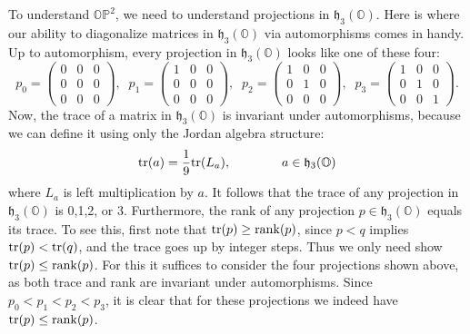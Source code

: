 \documentclass[12pt]{article}
\renewcommand\O{{\mathbb O}}
\newcommand\OP{{\mathbb {OP}}}
\newcommand{\h}{{\mathfrak {h}}}
\newcommand{\tr}{{\rm tr}}
\newcommand{\rank}{{\rm rank}}
\begin{document}
To understand $\OP^2$, we need to understand projections in $\h_3(\O)$.  
Here is where our ability to diagonalize matrices in $\h_3(\O)$ via 
automorphisms comes in handy.  Up to automorphism, every projection in 
$\h_3(\O)$ looks like one of these four: 
\[  
p_0 = 
\left( \begin{array}{ccc}  
                         0  &  0  & 0         \\  
                         0  &  0  & 0           \\ 
                         0  &  0  & 0   \end{array} \right) , \; \;
p_1 =  
\left( \begin{array}{ccc}  
                         1  &  0  & 0         \\  
                         0  &  0  & 0           \\ 
                         0  &  0  & 0   \end{array} \right) , \; \;
p_2 =  
\left( \begin{array}{ccc}  
                         1  &  0  & 0         \\  
                         0  &  1  & 0           \\ 
                         0  &  0  & 0   \end{array} \right) , \; \;
p_3 =  
\left( \begin{array}{ccc}  
                         1  &  0  & 0         \\  
                         0  &  1  & 0           \\ 
                         0  &  0  & 1   \end{array} \right) .  \] 
Now, the trace of a matrix in $\h_3(\O)$ is invariant under 
automorphisms, because we can define it using only the Jordan algebra 
structure: 
\[        \tr(a) = {1\over 9} \tr(L_a)    , \qquad \qquad a \in \h_3(\O) \] 
where $L_a$ is left multiplication by $a$.  It follows that the trace of
any projection in $\h_3(\O)$ is 0,1,2, or 3.  Furthermore, the rank of
any projection $p \in \h_3(\O)$ equals its trace.  To see this, first
note that $\tr(p) \ge \rank(p)$, since $p < q$ implies $\tr(p) <
\tr(q)$, and the trace goes up by integer steps.  Thus we only need
show $\tr(p) \le \rank(p)$.  For this it suffices to consider the four
projections shown above, as both trace and rank are invariant under
automorphisms.  Since $p_0 < p_1 < p_2 < p_3$, it is clear that for
these projections we indeed have $\tr(p) \le \rank(p)$.
\end{document}
